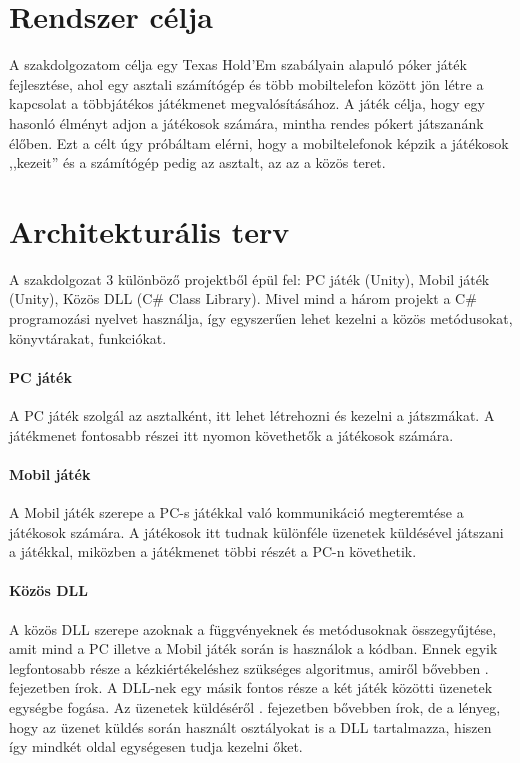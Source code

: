 \documentclass[]{thesis-ekf}
\theoremstyle{definition}
\theoremstyle{remark}
\begin{document}
\section{Rendszer célja}

A szakdolgozatom célja egy Texas Hold'Em szabályain alapuló póker játék fejlesztése, ahol egy asztali számítógép és több mobiltelefon között jön létre a kapcsolat a többjátékos játékmenet megvalósításához. A játék célja, hogy egy hasonló élményt adjon a játékosok számára, mintha rendes pókert játszanánk élőben. Ezt a célt úgy próbáltam elérni, hogy a mobiltelefonok képzik a játékosok ,,kezeit'' és a számítógép pedig az asztalt, az az a közös teret.

\section{Architekturális terv}
\label{sec-architecture}

A szakdolgozat 3 különböző projektből épül fel: PC játék (Unity), Mobil játék (Unity), Közös DLL (C\# Class Library). Mivel mind a három projekt a C\# programozási nyelvet használja, így egyszerűen lehet kezelni a közös metódusokat, könyvtárakat, funkciókat.

\paragraph{PC játék}

A PC játék szolgál az asztalként, itt lehet létrehozni és kezelni a játszmákat. A játékmenet fontosabb részei itt nyomon követhetők a játékosok számára. 

\paragraph{Mobil játék}

A Mobil játék szerepe a PC-s játékkal való kommunikáció megteremtése a játékosok számára. A játékosok itt tudnak különféle üzenetek küldésével játszani a játékkal, miközben a játékmenet többi részét a PC-n követhetik.

\paragraph{Közös DLL}

A közös DLL szerepe azoknak a függvényeknek és metódusoknak összegyűjtése, amit mind a PC illetve a Mobil játék során is használok a kódban. Ennek egyik legfontosabb része a kézkiértékeléshez szükséges algoritmus, amiről bővebben . fejezetben írok. A DLL-nek egy másik fontos része a két játék közötti üzenetek egységbe fogása. Az üzenetek küldéséről . fejezetben bővebben írok, de a lényeg, hogy az üzenet küldés során használt osztályokat is a DLL tartalmazza, hiszen így mindkét oldal egységesen tudja kezelni őket.
\end{document}
